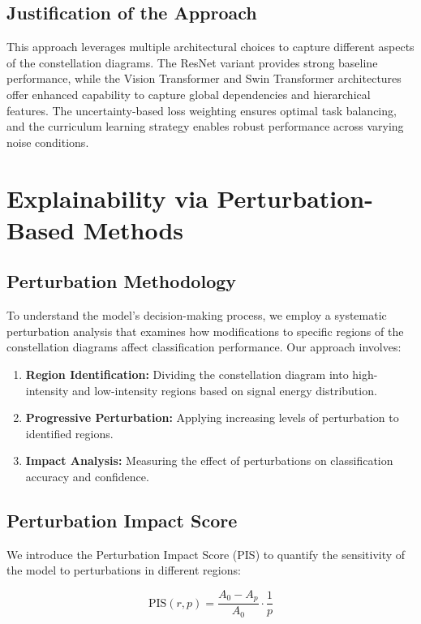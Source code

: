 \documentclass{ELSP}
\begin{document}
\subsection{Justification of the Approach}
This approach leverages multiple architectural choices to capture different aspects of the constellation diagrams. The ResNet variant provides strong baseline performance, while the Vision Transformer and Swin Transformer architectures offer enhanced capability to capture global dependencies and hierarchical features. The uncertainty-based loss weighting ensures optimal task balancing, and the curriculum learning strategy enables robust performance across varying noise conditions.

\section{Explainability via Perturbation-Based Methods}
\subsection{Perturbation Methodology}
To understand the model's decision-making process, we employ a systematic perturbation analysis that examines how modifications to specific regions of the constellation diagrams affect classification performance. Our approach involves:

\begin{enumerate}[(1)]
    \item \textbf{Region Identification:} Dividing the constellation diagram into high-intensity and low-intensity regions based on signal energy distribution.
    \item \textbf{Progressive Perturbation:} Applying increasing levels of perturbation to identified regions.
    \item \textbf{Impact Analysis:} Measuring the effect of perturbations on classification accuracy and confidence.
\end{enumerate}

\subsection{Perturbation Impact Score}
We introduce the Perturbation Impact Score (PIS) to quantify the sensitivity of the model to perturbations in different regions:

\begin{equation}
    \text{PIS}(r, p) = \frac{A_0 - A_p}{A_0} \cdot \frac{1}{p}
\end{equation}
\end{document}
